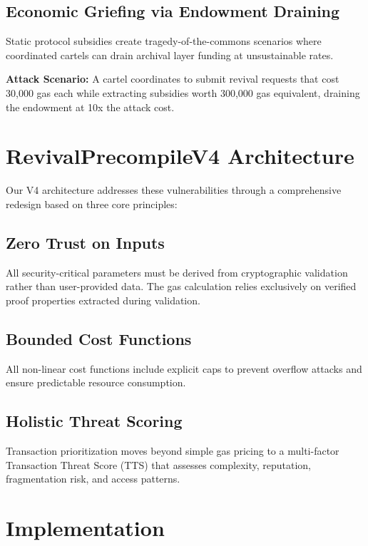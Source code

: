 \documentclass{article}
\begin{document}
\subsection{Economic Griefing via Endowment Draining}

Static protocol subsidies create tragedy-of-the-commons scenarios where coordinated cartels can drain archival layer funding at unsustainable rates.

\textbf{Attack Scenario:} A cartel coordinates to submit revival requests that cost 30,000 gas each while extracting subsidies worth 300,000 gas equivalent, draining the endowment at 10x the attack cost.

\section{RevivalPrecompileV4 Architecture}

Our V4 architecture addresses these vulnerabilities through a comprehensive redesign based on three core principles:

\subsection{Zero Trust on Inputs}

All security-critical parameters must be derived from cryptographic validation rather than user-provided data. The gas calculation relies exclusively on verified proof properties extracted during validation.

\subsection{Bounded Cost Functions}

All non-linear cost functions include explicit caps to prevent overflow attacks and ensure predictable resource consumption.

\subsection{Holistic Threat Scoring}

Transaction prioritization moves beyond simple gas pricing to a multi-factor Transaction Threat Score (TTS) that assesses complexity, reputation, fragmentation risk, and access patterns.

\section{Implementation}
\end{document}
